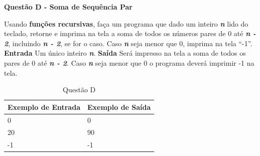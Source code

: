 \documentclass[a4paper, 12pt]{article}
\begin{document}
\newpage %
\begin{center}
\textbf{{\Large Questão D - Soma de Sequência Par}}
\end{center}
\vspace{5pt}
Usando \textbf{funções recursivas}, faça um programa que dado um inteiro \textbf{\textit{n}} lido do
teclado, retorne e imprima na tela a soma de todos os números pares de 0 até
\textbf{\textit{n - 2}}, incluindo \textbf{\textit{n - 2}}, se for o caso. Caso \textbf{\textit{n}} seja menor que 0, imprima na tela ``-1''.
\newline \newline
\textbf{{\large Entrada}} \newline 
Um único inteiro \textbf{\textit{n}}.
\newline \newline
\textbf{{\large Saída}} \newline
Será impresso na tela a soma de todos os pares de 0 até \textbf{\textit{n - 2}}. Caso \textbf{\textit{n}} seja menor que 0 o programa deverá imprimir -1 na tela.
\newline
\begin{table}[H]
	\centering
	\begin{tabular}{|l|l|}
	\hline
	\textbf{Exemplo de Entrada} & \textbf{Exemplo de Saída} \\ \hline
	0 & 0 \\ \hline
	20 & 90 \\ \hline
	-1 & -1 \\ \hline
	\end{tabular}
	\caption{Questão D}
	\label{tabela4}
\end{table}
\end{document}
